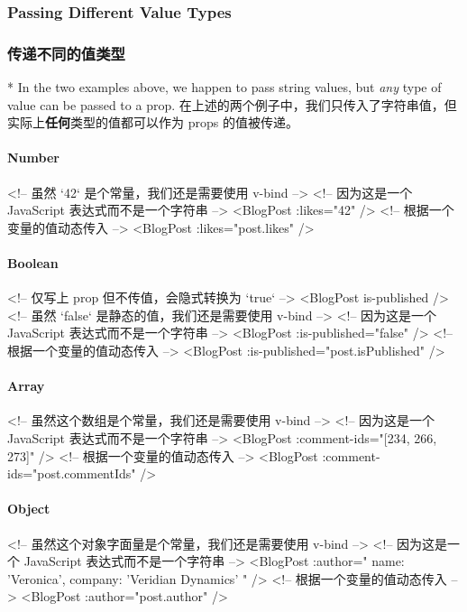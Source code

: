 \begin{paracol}{2}
\subsubsection{Passing Different Value Types}
\switchcolumn
\subsubsection{传递不同的值类型}
\switchcolumn[0]*%
In the two examples above, we happen to pass string values, but
\emph{any} type of value can be passed to a prop.
\switchcolumn
在上述的两个例子中，我们只传入了字符串值，但实际上\textbf{任何}类型的值都可以作为
props 的值被传递。
\end{paracol}

\paragraph{Number}

\begin{codeHtml}
<!-- 虽然 `42` 是个常量，我们还是需要使用 v-bind -->
<!-- 因为这是一个 JavaScript 表达式而不是一个字符串 -->
<BlogPost :likes="42" />
<!-- 根据一个变量的值动态传入 -->
<BlogPost :likes="post.likes" />
\end{codeHtml}

\paragraph{Boolean}
\begin{codeHtml}
<!-- 仅写上 prop 但不传值，会隐式转换为 `true` -->
<BlogPost is-published />
<!-- 虽然 `false` 是静态的值，我们还是需要使用 v-bind -->
<!-- 因为这是一个 JavaScript 表达式而不是一个字符串 -->
<BlogPost :is-published="false" />
<!-- 根据一个变量的值动态传入 -->
<BlogPost :is-published="post.isPublished" />
\end{codeHtml}

\paragraph{Array}
\begin{codeHtml}
<!-- 虽然这个数组是个常量，我们还是需要使用 v-bind -->
<!-- 因为这是一个 JavaScript 表达式而不是一个字符串 -->
<BlogPost :comment-ids="[234, 266, 273]" />
<!-- 根据一个变量的值动态传入 -->
<BlogPost :comment-ids="post.commentIds" />
\end{codeHtml}

\paragraph{Object}
\begin{codeHtml}
<!-- 虽然这个对象字面量是个常量，我们还是需要使用 v-bind -->
<!-- 因为这是一个 JavaScript 表达式而不是一个字符串 -->
<BlogPost
    :author="{
    name: 'Veronica',
    company: 'Veridian Dynamics'
    }"
    />
<!-- 根据一个变量的值动态传入 -->
<BlogPost :author="post.author" />
\end{codeHtml}

